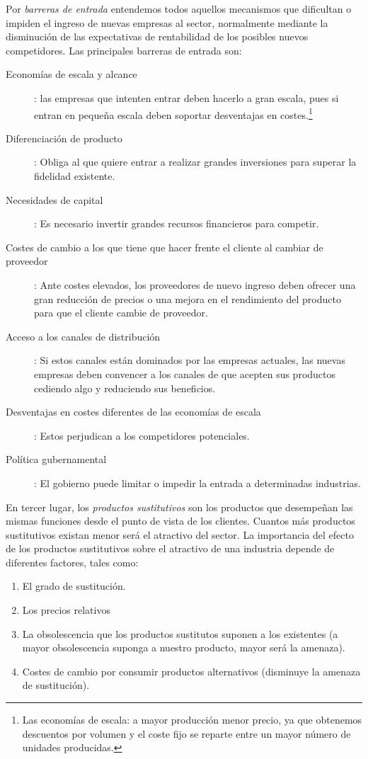 \documentclass[10pt,a4paper,spanish]{report}
\begin{document}
            Por \textit{\textcolor[rgb]{0.3,0.4,0.6}{barreras de entrada}} entendemos todos aquellos mecanismos que dificultan o impiden el ingreso de nuevas empresas al sector, normalmente mediante la disminución de las expectativas de rentabilidad de los posibles nuevos competidores. Las principales barreras de entrada son:
            \begin{description}
                  \item[Economías de escala y alcance]: las empresas que intenten entrar deben hacerlo a gran escala, pues si entran en pequeña escala deben soportar desventajas en costes.\footnote{Las economías de escala: a mayor producción menor precio, ya que obtenemos descuentos por volumen y el coste fijo se reparte entre un mayor número de unidades producidas.}
                  \item[Diferenciación de producto]: Obliga al que quiere entrar a realizar grandes inversiones para superar la fidelidad existente.
                  \item[Necesidades de capital]: Es necesario invertir grandes recursos financieros para competir.
                  \item[Costes de cambio a los que tiene que hacer frente el cliente al cambiar de proveedor]: Ante costes elevados, los proveedores de nuevo ingreso deben ofrecer una gran reducción de precios o una mejora en el rendimiento del producto para que el cliente cambie de proveedor.
                  \item[Acceso a los canales de distribución]: Si estos canales están dominados por las empresas actuales, las nuevas empresas deben convencer a los canales de que acepten sus productos cediendo algo y reduciendo sus beneficios.
                  \item[Desventajas en costes diferentes de las economías de escala]: Estos perjudican a los competidores potenciales.
                  \item[Política gubernamental]: El gobierno puede limitar o impedir la entrada a determinadas industrias.
            \end{description}

            En tercer lugar, los \textit{\textcolor[rgb]{0.3,0.4,0.6}{productos sustitutivos}} son los productos que desempeñan las mismas funciones desde el punto de vista de los clientes. Cuantos más productos sustitutivos existan menor será el atractivo del sector. La importancia del efecto de los productos sustitutivos sobre el atractivo de una industria depende de diferentes factores, tales como:
            \begin{enumerate}
                  \item El grado de sustitución.
                  \item Los precios relativos
                  \item La obsolescencia que los productos sustitutos suponen a los existentes (a mayor obsolescencia suponga a nuestro producto, mayor será la amenaza).
                  \item Costes de cambio por consumir productos alternativos (disminuye la amenaza de sustitución).
            \end{enumerate}
\end{document}
